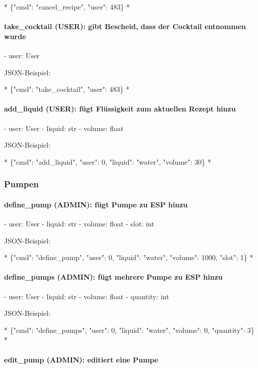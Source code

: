 *
\{"cmd": "cancel\_recipe", "user": 483\}
*

\paragraph{ take\_cocktail (USER): gibt Bescheid, dass der Cocktail entnommen wurde}

- user: User

JSON-Beispiel:

*
\{"cmd": "take\_cocktail", "user": 483\}
*

\paragraph{ add\_liquid (USER): fügt Flüssigkeit zum aktuellen Rezept hinzu}

- user: User
- liquid: str
- volume: float

JSON-Beispiel:

*
\{"cmd": "add\_liquid", "user": 0, "liquid": "water", "volume": 30\}
*

\subsubsection{ Pumpen}

\paragraph{ define\_pump (ADMIN): fügt Pumpe zu ESP hinzu}

- user: User
- liquid: str
- volume: float
- slot: int

JSON-Beispiel:

*
\{"cmd": "define\_pump", "user": 0, "liquid": "water", "volume": 1000, "slot": 1\}
*

\paragraph{ define\_pumps (ADMIN): fügt mehrere Pumpe zu ESP hinzu}

- user: User
- liquid: str
- volume: float
- quantity: int

JSON-Beispiel:

*
\{"cmd": "define\_pumps", "user": 0, "liquid": "water", "volume": 0, "quantity": 3\}
*

\paragraph{ edit\_pump (ADMIN): editiert eine Pumpe}

